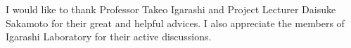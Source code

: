 I would like to thank Professor Takeo Igarashi and Project Lecturer Daisuke Sakamoto for their great and helpful advices. I also appreciate the members of Igarashi Laboratory for their active discussions.
